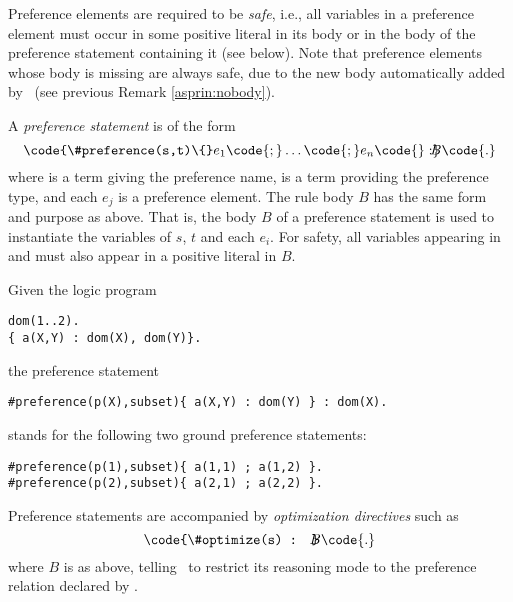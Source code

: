 \begin{note}
Preference elements are required to be \emph{safe}, 
i.e., all variables in a preference element must occur in some positive literal 
in its body or in the body of the preference statement containing it (see below).  
%
Note that preference elements whose body is missing are always safe, 
due to the new body automatically added by \asprin\ 
(see previous Remark \ref{asprin:nobody}).
\end{note} 

A \emph{preference statement} is of the form %
\[\code{\#preference(s,t)\{}e_1\code{;}\dots\code{;}e_n\code{\} : }\!\!\!\!B\code{.}\]
%
where  is a term giving the preference name, 
 is a  term providing the preference type, 
and each $e_j$ is a preference element.
The rule body $B$ has the same form and purpose as above.
%
That is, the body $B$ of a preference statement is used to instantiate the variables of $s$, $t$ and each $e_i$.
For safety, all variables appearing in \code{s} and \code{t} must also appear in a positive literal in $B$.

\begin{example}
\label{asprin:example2}
Given the logic program 
\begin{lstlisting}[numbers=none]
dom(1..2).
{ a(X,Y) : dom(X), dom(Y)}.
\end{lstlisting}
the preference statement 
\begin{lstlisting}[numbers=none]
#preference(p(X),subset){ a(X,Y) : dom(Y) } : dom(X).
\end{lstlisting}
stands for the following two ground preference statements:
\begin{lstlisting}[numbers=none]
#preference(p(1),subset){ a(1,1) ; a(1,2) }.
#preference(p(2),subset){ a(2,1) ; a(2,2) }.
\end{lstlisting}
\end{example}

Preference statements are accompanied by 
\emph{optimization directives} such as
\[\code{\#optimize(s) : }\!\!\!\!B\code{.}\]
where $B$ is as above, 
telling \asprin\ to restrict its reasoning mode to the preference relation declared by .
% 

